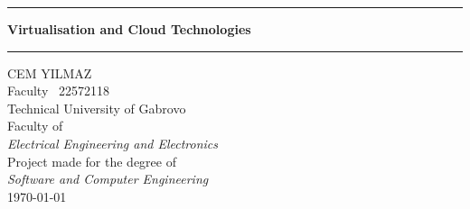 \documentclass[a4paper, 12pt]{article}
\newcommand{\coloredrule}[2][tugblue]{
  \textcolor{#1}{\rule{\linewidth}{#2}}
}
\theoremstyle{plain}
\theoremstyle{definition}
\theoremstyle{remark}
\begin{document}
	\begin{titlepage}
        \vspace*{0.8cm}
        \begin{center}
           \coloredrule{2pt}\par
            \vskip 0.6cm
            \textbf{\Huge Virtualisation and Cloud Technologies}\par
            \vskip 0.3cm
            \coloredrule{2pt}\par

            \vskip 3cm

            

            \vspace{3cm}
            \Large CEM YILMAZ\\
            Faculty \textnumero \ 22572118\\
            \Large Technical University of Gabrovo \\
            \Large Faculty of \\
            \Large\textit{Electrical Engineering and Electronics}\\

            \vspace{2cm}
            \Large Project made for the degree of\\
            \Large \textit{Software and Computer Engineering}\\
            \Large \today \\
            \vspace{0.5cm}

            \vfill
        \end{center}
    \end{titlepage}
    \onehalfspacing
	\tableofcontents
	\newpage
\end{document}
